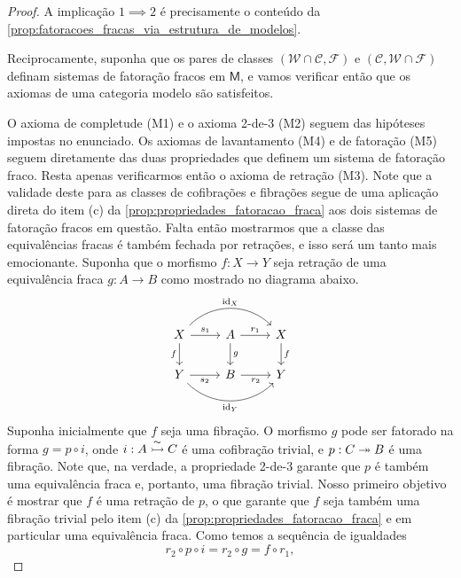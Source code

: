 \begin{proof}
  A implicação $1 \implies 2$ é precisamente o conteúdo da \cref{prop:fatoracoes_fracas_via_estrutura_de_modelos}.

  Reciprocamente, suponha que os pares de classes $(\mathcal{W} \cap \mathcal{C},\mathcal{F})$ e $(\mathcal{C},\mathcal{W} \cap \mathcal{F})$ definam sistemas de fatoração fracos em $\mathsf{M}$, e vamos verificar então que os axiomas de uma categoria modelo são satisfeitos.
  
  O axioma de completude (M1) e o axioma 2-de-3 (M2) seguem das hipóteses impostas no enunciado.
  Os axiomas de lavantamento (M4) e de fatoração (M5) seguem diretamente das duas propriedades que definem um sistema de fatoração fraco.
  Resta apenas verificarmos então o axioma de retração (M3).
  Note que a validade deste para as classes de cofibrações e fibrações segue de uma aplicação direta do item (c) da \cref{prop:propriedades_fatoracao_fraca} aos dois sistemas de fatoração fracos em questão.
  Falta então mostrarmos que a classe das equivalências fracas é também fechada por retrações, e isso será um tanto mais emocionante.
  Suponha que o morfismo $f: X \to Y$ seja retração de uma equivalência fraca $g: A \to B$ como mostrado no diagrama abaixo.
  \begin{displaymath}
    \begin{tikzcd}
      X
      \arrow[d, "f" swap]
      \arrow[r, "s_{1}"]
      \arrow[rr, bend left=45, "\id_{X}"]
      & A
      \arrow[d, "g"]
      \arrow[r, "r_{1}"]
      & X
      \arrow[d, "f"]
      \\ Y
      \arrow[r, "s_{2}" swap]
      \arrow[rr, bend right=45, "\id_{Y}" swap]
      & B
      \arrow[r, "r_{2}" swap]
      & Y
    \end{tikzcd}
  \end{displaymath}
  Suponha inicialmente que $f$ seja uma fibração.
  O morfismo $g$ pode ser fatorado na forma $g = p \circ i$, onde $i: A \overset{\sim}{\rightarrowtail} C$ é uma cofibração trivial, e $p: C \twoheadrightarrow B$ é uma fibração.
  Note que, na verdade, a propriedade 2-de-3 garante que $p$ é também uma equivalência fraca e, portanto, uma fibração trivial.
  Nosso primeiro objetivo é mostrar que $f$ é uma retração de $p$, o que garante que $f$ seja também uma fibração trivial pelo item (c) da \cref{prop:propriedades_fatoracao_fraca} e em particular uma equivalência fraca.
  Como temos a sequência de igualdades
  \begin{displaymath}
    r_{2} \circ p \circ i = r_{2} \circ g = f \circ r_{1},

\end{displaymath}
\end{proof}
